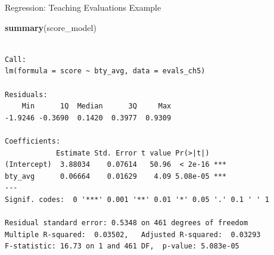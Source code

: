 \documentclass[
  ignorenonframetext,
]{beamer}
\newenvironment{Shaded}{\begin{snugshade}}{\end{snugshade}}
\newcommand{\FunctionTok}[1]{\textcolor[rgb]{0.13,0.29,0.53}{\textbf{#1}}}
\newcommand{\NormalTok}[1]{#1}
\begin{document}
\begin{frame}[fragile]{Regression: Teaching Evaluations Example}
\label{regression-teaching-evaluations-example-8}
\small

\begin{Shaded}
\begin{Highlighting}[]
\FunctionTok{summary}\NormalTok{(score\_model)}
\end{Highlighting}
\end{Shaded}

\begin{verbatim}

Call:
lm(formula = score ~ bty_avg, data = evals_ch5)

Residuals:
    Min      1Q  Median      3Q     Max 
-1.9246 -0.3690  0.1420  0.3977  0.9309 

Coefficients:
            Estimate Std. Error t value Pr(>|t|)    
(Intercept)  3.88034    0.07614   50.96  < 2e-16 ***
bty_avg      0.06664    0.01629    4.09 5.08e-05 ***
---
Signif. codes:  0 '***' 0.001 '**' 0.01 '*' 0.05 '.' 0.1 ' ' 1

Residual standard error: 0.5348 on 461 degrees of freedom
Multiple R-squared:  0.03502,   Adjusted R-squared:  0.03293 
F-statistic: 16.73 on 1 and 461 DF,  p-value: 5.083e-05
\end{verbatim}

\normalsize
\end{frame}
\end{document}
